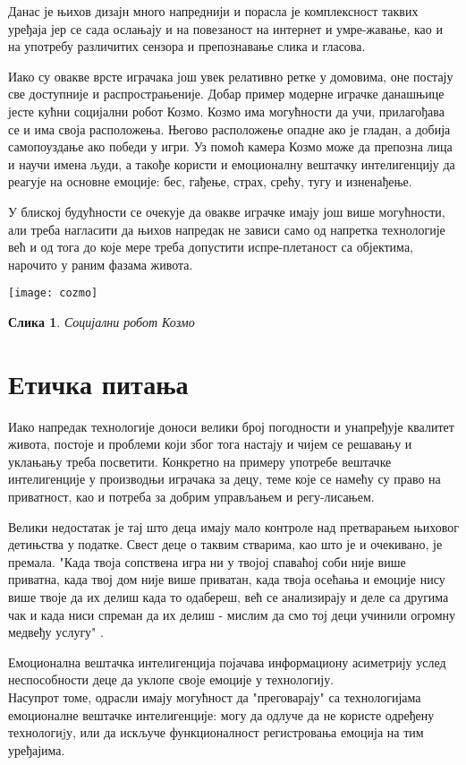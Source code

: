 \documentclass{article}
\newtheorem{image}{Слика}
\begin{document}
Данас је њихов дизајн много напреднији и порасла је комплексност таквих уређаја јер се сада ослањају и на повезаност на интернет и умре-жавање, као и на употребу различитих сензора и препознавање слика и гласова. 

Иако су овакве врсте играчака још увек релативно ретке у домовима, оне постају све доступније и распрострањеније. Добар пример модерне играчке данашњице јесте кућни социјални робот Козмо. Козмо има могућности да учи, прилагођава се и има своја расположења. Његово расположење опадне ако је гладан, а добија самопоуздање ако победи у игри. Уз помоћ камера Козмо може да препозна лица и научи имена људи, а такође користи и емоционалну вештачку интелигенцију да реагује на основне емоције: бес, гађење, страх, срећу, тугу и изненађење.

У блиској будућности се очекује да овакве играчке имају још више могућности, али треба нагласити да њихов напредак не зависи само од напретка технологије већ и од тога до које мере треба допустити испре-плетаност са објектима, нарочито у раним фазама живота. 


\texttt{[image: cozmo]}
\begin{image}
\centering
Социјални робот Козмо
\end{image}


\section{Етичка питања}
Иако напредак технологије доноси велики број погодности и унапређује квалитет живота, постоје и проблеми који због тога настају и чијем се решавању и уклањању треба посветити. Конкретно на примеру употребе вештачке интелигенције у производњи играчака за децу, теме које се намећу су право на приватност,  као и потреба за добрим управљањем и регу-лисањем.

Велики недостатак је тај што деца имају мало контроле над претварањем њиховог детињства у податке. Свест деце о таквим стварима, као што је и очекивано, је премала. 
"Када твоја сопствена игра ни у твојој спаваћој соби није више приватна, када твој дом није више приватан, када твоја осећања и емоције нису више твоје да их делиш када то одабереш, већ се анализирају и деле са другима чак и када ниси спреман да их делиш - мислим да смо тој деци учинили огромну медвеђу услугу" \cite{mcstay2021emotional}. 

Емоционална вештачка интелигенција појачава информациону асиметрију услед неспособности деце да уклопе своје емоције у технологију. \\Насупрот томе, одрасли имају могућност да "преговарају" са технологијама  емоционалне вештачке интелигенције: могу да одлуче да не користе одређену технологиjу, или да искључе функционалност регистровања емоција на тим уређајима.
\end{document}
